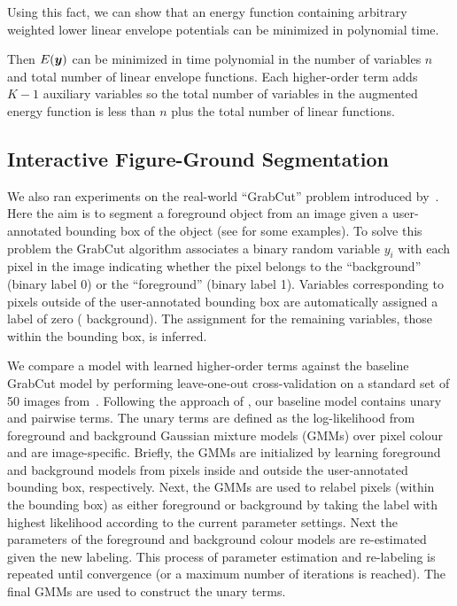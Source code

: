 \documentclass[twoside,doublespace,onecolumn,11pt,a4paper]{book}
\renewcommand{\citename}{\citet}
\begin{document}
Using this fact, we can show that an energy function containing
arbitrary weighted lower linear envelope potentials can be
minimized in polynomial time.

Then $E\!\left({\boldsymbol{y}}\right)$ can be minimized in time polynomial in the
number of variables $n$ and total number of linear envelope
functions. Each higher-order term adds $K - 1$ auxiliary
variables so the total number of variables in the augmented
energy function is less than $n$ plus the total number of linear
functions.

\subsection{Interactive Figure-Ground Segmentation}

We also ran experiments on the real-world ``GrabCut'' problem
introduced by~\citename{Rother:SIGGRAPH04}. Here the aim is to
segment a foreground object from an image given a user-annotated
bounding box of the object (see %
for some examples). To solve this problem the GrabCut algorithm
associates a binary random variable $y_i$ with each pixel in the
image indicating whether the pixel belongs to the ``background''
(binary label 0) or the ``foreground'' (binary label 1).
Variables corresponding to pixels outside of the user-annotated
bounding box are automatically assigned a label of zero (\ie
background). The assignment for the remaining variables, \ie
those within the bounding box, is inferred.

We compare a model with learned higher-order terms against the
baseline GrabCut model by performing leave-one-out
cross-validation on a standard set of 50 images
from~\citename{Lempitsky:ICCV09}. Following the approach of
\citename{Rother:SIGGRAPH04}, our baseline model contains unary
and pairwise terms. The unary terms are defined as the
log-likelihood from foreground and background Gaussian mixture
models (GMMs) over pixel colour and are image-specific. Briefly,
the GMMs are initialized by learning foreground and background
models from pixels inside and outside the user-annotated bounding
box, respectively. Next, the GMMs are used to relabel pixels
(within the bounding box) as either foreground or background by
taking the label with highest likelihood according to the current
parameter settings. Next the parameters of the foreground and
background colour models are re-estimated given the new labeling.
This process of parameter estimation and re-labeling is repeated
until convergence (or a maximum number of iterations is reached).
The final GMMs are used to construct the unary terms.
\end{document}
